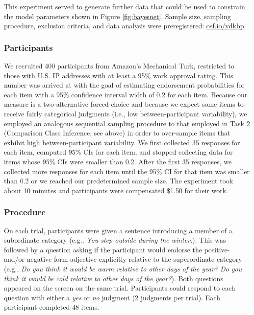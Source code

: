 \documentclass[doc]{apa6}
\begin{document}
This experiment served to generate further data that could be used to constrain the model parameters shown in Figure \ref{fig:bayesnet}.
Sample size, sampling procedure, exclusion criteria, and data analysis were preregistered: \url{osf.io/vdkbp}.

\subsubsection{Participants}

We recruited 400 participants from Amazon's Mechanical Turk, restricted to those with U.S. IP addresses with at least a 95\% work approval rating.
This number was arrived at with the goal of estimating endorsement probabilities for each item with a 95\% confidence interval width of 0.2 for each item.
Because our measure is a two-alternative forced-choice and because we expect some items to receive fairly categorical judgments (i.e., low between-participant variability), we employed an analogous sequential sampling procedure to that employed in Task 2 (Comparison Class Inference, see above) in order to over-sample items that exhibit high between-participant variability.
We first collected 35 responses for each item, computed 95\% CIs for each item, and stopped collecting data for items whose 95\% CIs were smaller than 0.2.
After the first 35 responses, we collected more responses for each item until the 95\% CI for that item was smaller than 0.2 or we reached our predetermined sample size.
The experiment took about 10 minutes and participants were compensated \$1.50 for their work.

\subsubsection{Procedure}

On each trial, participants were given a sentence introducing a member of a subordinate category (e.g., \emph{You step outside during the winter.}).
This was followed by a question asking if the participant would endorse the positive- and/or negative-form adjective explicitly relative to the superordinate category (e.g., \emph{Do you think it would be warm relative to other days of the year? Do you think it would be cold relative to other days of the year?}).
Both questions appeared on the screen on the same trial.
Participants could respond to each question with either a \emph{yes} or \emph{no} judgment (2 judgments per trial).
Each participant completed 48 items.
\end{document}
